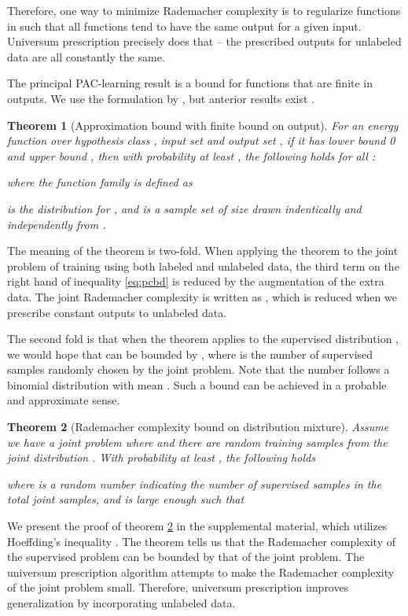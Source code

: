 \documentclass[letterpaper]{article}
\newtheorem{theorem}{Theorem}
\begin{document}
Therefore, one way to minimize Rademacher complexity is to regularize functions in  such that all functions tend to have the same output for a given input. Universum prescription precisely does that -- the prescribed outputs for unlabeled data are all constantly the same.

The principal PAC-learning result is a bound for functions that are finite in outputs. We use the formulation by \cite{Z13}, but anterior results exist \cite{BBL02} \cite{BM03} \cite{K01} \cite{KP00}.
\begin{theorem} [Approximation bound with finite bound on output]
  For an energy function \cite{LCHRH06}  over hypothesis class , input set  and output set , if it has lower bound 0 and upper bound , then with probability at least , the following holds for all :
  
  where the function family  is defined as
  
   is the distribution for , and  is a sample set of size  drawn indentically and independently from .
\end{theorem}

The meaning of the theorem is two-fold. When applying the theorem to the joint problem of training using both labeled and unlabeled data, the third term on the right hand of inequality \ref{eq:pcbd} is reduced by the augmentation of the extra data. The joint Rademacher complexity is written as , which is reduced when we prescribe constant outputs to unlabeled data.

The second fold is that when the theorem applies to the supervised distribution , we would hope that  can be bounded by , where  is the number of supervised samples randomly chosen by the joint problem. Note that the number  follows a binomial distribution with mean . Such a bound can be achieved in a probable and approximate sense.

\begin{theorem} [Rademacher complexity bound on distribution mixture]
  \label{thm:rbdm}
  Assume we have a joint problem where  and there are  random training samples from the joint distribution . With probability at least , the following holds
  
  where  is a random number indicating the number of supervised samples in the total joint samples, and  is large enough such that
  
\end{theorem}


We present the proof of theorem \ref{thm:rbdm} in the supplemental material, which utilizes Hoeffding's inequality \cite{H63} \cite{S74}. The theorem tells us that the Rademacher complexity of the supervised problem can be bounded by that of the joint problem. The universum prescription algorithm attempts to make the Rademacher complexity of the joint problem small. Therefore, universum prescription improves generalization by incorporating unlabeled data.
\end{document}
